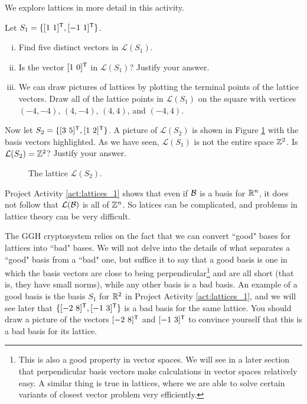 \begin{pactivity} \label{act:lattices_1} We explore lattices in more detail in this activity.
\ba
\item Let $S_1 = \{[1 \ 1]^{\tr}, [-1 \ 1]^{\tr}\}$. 
	\begin{enumerate}[i.]
	\item Find five distinct vectors in $\mathcal{L}(S_1)$.
	

	\item Is the vector $[1 \ 0]^{\mathsf{T}}$ in $\mathcal{L}(S_1)$? Justify your answer.
	
	
	\item We can draw pictures of lattices by plotting the terminal points of the lattice vectors. Draw all of the lattice points in $\mathcal{L}(S_1)$ on the square with vertices $(-4,-4)$, $(4,-4)$, $(4,4)$, and $(-4,4)$. 


	\end{enumerate}
	
\item Now let $S_2 = \{[3 \ 5]^{\tr}, [1 \ 2]^{\tr}\}$. A picture of $\mathcal{L}(S_2)$ is shown in Figure \ref{F:Lattice_2} with the basis vectors highlighted. As we have seen, $\mathcal{L}(S_1)$ is not the entire space $\mathbb{Z}^2$. Is $\mathcal{L}(S_2) = \mathbb{Z}^2$? Justify your answer. 
\begin{figure}[h]
\begin{center}
\caption{The lattice $\mathcal{L}(S_2)$.}
\label{F:Lattice_2}
\end{center}
\end{figure}


\ea

\end{pactivity}

Project Activity \ref{act:lattices_1} shows that even if $\mathcal{B}$ is a basis for $\mathbb{R}^n$, it does not follow that $\mathcal{L}(\mathcal{B})$ is all of $\mathbb{Z}^n$. So latices can be complicated, and problems in lattice theory can be very difficult. 

The GGH cryptosystem relies on the fact that we can convert ``good" bases for lattices into ``bad" bases. We will not delve into the details of what separates a ``good" basis from a ``bad" one, but suffice it to say that a good basis is one in which the basis vectors are close to being perpendicular\footnote{This is also a good property in vector spaces. We will see in a later section that perpendicular basis vectors make calculations in vector spaces relatively easy. A similar thing is true in lattices, where we are able to solve certain variants of closest vector problem very efficiently.} and are all short (that is, they have small norms), while any other basis is a bad basis. An example of a good basis is the basis $S_1$ for $\mathbb{R}^2$ in Project Activity \ref{act:lattices_1}, and we will see later that $\{[-2 \ 8]^{\tr}, [-1 \ 3]^{\tr}\}$ is a bad basis for the same lattice. You should draw a picture of the vectors $[-2 \ 8]^{\tr}$ and $[-1 \ 3]^{\mathsf{T}}$ to convince yourself that this is a bad basis for its lattice.  

